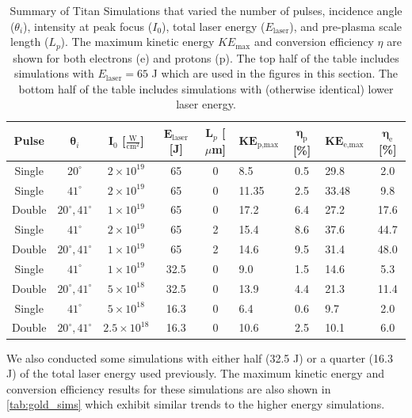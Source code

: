 \renewcommand{\arraystretch}{1.15}
\setlength{\tabcolsep}{0.5em}
\begin{table}
	\centering
	\begin{tabular}{|c|c|c|c|c|p{1.4cm}|c|p{1.4cm}|c|}
		\hline
		\hline
		\textbf{Pulse} & $\pmb{\theta}_i$ & $\mathbf{I}_0$ [$\frac{\text{W}}{\text{cm}^2}$]  & $\mathbf{E}_\text{laser}$ [J] & $\mathbf{L}_p$ [$\mu$m] & $\mathbf{KE}_\text{p,max}$\newline [MeV] & $\pmb{\eta}_\text{p}$ [\%] & $\mathbf{KE}_\text{e,max}$\newline [MeV]& $\pmb{\eta}_{\text{e}}$ [\%] \\
		\hline 
		Single & $20^\circ$ & $2 \times 10^{19}$ & 65 & 0 & 8.5 & 0.5 & 29.8 & 2.0 \\
		\hline
		Single & $41^\circ$ & $2 \times 10^{19}$ & 65 & 0 & 11.35 & 2.5 & 33.48 & 9.8 \\
		Double & $20^\circ, 41^\circ$ & $1 \times 10^{19}$ & 65 & 0 & 17.2 & 6.4 & 27.2 & 17.6 \\
		Single & $41^\circ$ & $2 \times 10^{19}$ & 65 & 2 & 15.4 & 8.6 & 37.6 & 44.7 \\
		Double & $20^\circ, 41^\circ$ & $1 \times 10^{19}$ & 65 & 2 & 14.6 & 9.5 & 31.4 & 48.0 \\
		\hline 
		Single & $41^\circ$ & $1 \times 10^{19}$ & 32.5 & 0 & 9.0 & 1.5 & 14.6 & 5.3 \\
		Double & $20^\circ, 41^\circ$ & $5 \times 10^{18}$ & 32.5 & 0 & 13.9 & 4.4 & 21.3 & 11.4 \\
		Single & $41^\circ$ & $5 \times 10^{18}$ & 16.3 & 0 & 6.4 & 0.6 & 9.7 & 2.0 \\
		Double & $20^\circ, 41^\circ$ & $2.5 \times 10^{18}$ & 16.3 & 0 & 10.6 & 2.5 & 10.1 & 6.0 \\
		\hline
		\hline
	\end{tabular}
	\caption{Summary of Titan Simulations that varied the number of pulses, incidence angle ($\theta_i$), intensity at peak focus ($I_0$), total laser energy ($E_\text{laser}$), and pre-plasma scale length ($L_p$). The maximum kinetic energy $KE_\text{max}$ and conversion efficiency $\eta$ are shown for both electrons (e) and protons (p). The top half of the table includes simulations with $E_\text{laser} = 65$ J which are used in the figures in this section. The bottom half of the table includes simulations with (otherwise identical) lower laser energy.}
	\label{tab:gold_sims}
\end{table}

We also conducted some simulations with either half (32.5 J) or a quarter (16.3 J) of the total laser energy used previously. The maximum kinetic energy and conversion efficiency results for these simulations are also shown in \autoref{tab:gold_sims} which exhibit similar trends to the higher energy simulations.

